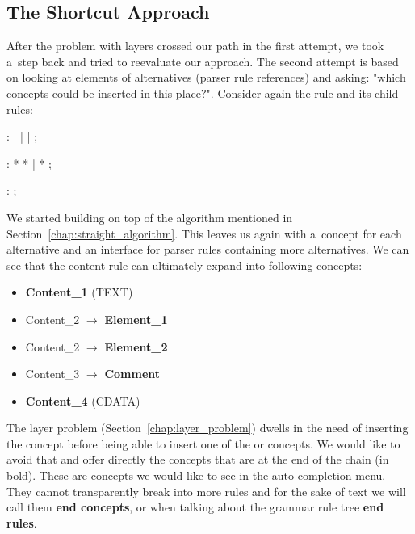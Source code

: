 \subsection{The Shortcut Approach}
\label{chap:shortcut_approach}

After the problem with layers crossed our path in the first attempt, we took a~step back and tried to reevaluate our approach.
The second attempt is based on looking at elements of alternatives (parser rule references) and asking: "which concepts could be inserted in this place?".
Consider again the  rule and its child rules:

\begin{antlr}
	    :   
           |   
           |   
           |   
           ;

	    :   \literal{<}  * \literal{>} * \literal{</}  \literal{>}
           |   \literal{<}  * \literal{/>}
           ;

	    :   \literal{<!--}  \literal{-->} ;
\end{antlr}

We started building on top of the algorithm mentioned in Section~\ref{chap:straight_algorithm}.
This leaves us again with a~concept for each alternative and an interface for parser rules containing more alternatives.
We can see that the content rule can ultimately expand into following concepts:

\begin{itemize}
	\itemsep0em
	\item \textbf{Content{\_}1} (TEXT)
	\item Content{\_}2 $\rightarrow$ \textbf{Element{\_}1}
	\item Content{\_}2 $\rightarrow$ \textbf{Element{\_}2}
	\item Content{\_}3 $\rightarrow$ \textbf{Comment}
	\item \textbf{Content{\_}4} (CDATA)
\end{itemize}

\vspace{0.4cm}

The layer problem (Section~\ref{chap:layer_problem}) dwells in the need of inserting the  concept before being able to insert one of the  or  concepts.
We would like to avoid that and offer directly the concepts that are at the end of the chain (in bold).
These are concepts we would like to see in the auto-completion menu.
They cannot transparently break into more rules and for the sake of text we will call them \textbf{end concepts}, or when talking about the grammar rule tree \textbf{end rules}.
\\

